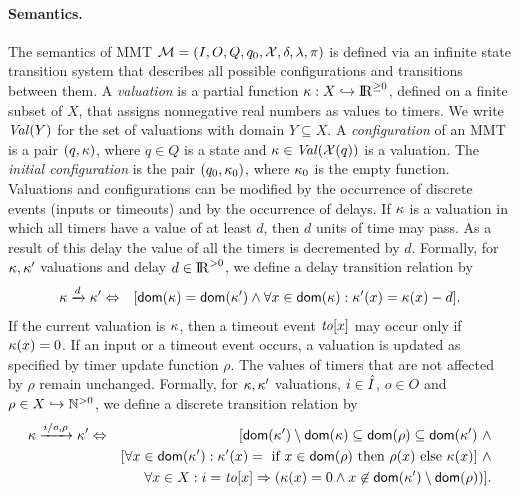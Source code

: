 \paragraph{Semantics.}
The semantics of MMT ${\cal M} = (I, O, Q, q_0, \mathcal{X}, \delta, \lambda, \pi)$ is defined via an infinite state transition system that describes all possible
configurations and transitions between them.
A \emph{valuation} is a partial function
$\kappa : X \hookrightarrow {\rm I\!R}^{\geq 0}$, defined on a finite subset of $X$, that assigns nonnegative real numbers as values to timers.
We write $\mathit{Val}({Y})$ for the set of valuations with domain $Y \subseteq X$.
A \emph{configuration} of an MMT is a pair $(q,\kappa)$, where $q \in Q$ is a state and $\kappa\in\mathit{Val}({\mathcal{X}(q)})$ is a valuation.
The \emph{initial configuration} is the pair $(q_0, \kappa_0)$, where $\kappa_0$ is the empty function.
Valuations and configurations can be modified by the occurrence of discrete events (inputs or timeouts) and by
the occurrence of delays.
If $\kappa$ is a valuation in which all timers
have a value of at least $d$, then $d$ units of time may pass. As a result of this delay the value of all the timers is decremented by $d$.
Formally, for $\kappa, \kappa'$ valuations and delay $d \in {\rm I\!R}^{> 0}$, we define a delay transition relation by
\begin{eqnarray*}
\kappa \xrightarrow{d} \kappa' & \Leftrightarrow & [{\textsf{dom}}(\kappa) = {\textsf{dom}}(\kappa') \wedge \forall x \in{\textsf{dom}}(\kappa) : \kappa'(x) = \kappa(x) - d ].
\end{eqnarray*}
If the current valuation is $\kappa$, then a timeout event $\mathit{to}[x]$ may occur only if $\kappa(x)=0$.
If an input or a timeout event occurs, a valuation is updated as specified by timer update function $\rho$.
The values of timers that are not affected by $\rho$ remain unchanged.
Formally, for $\kappa, \kappa'$ valuations, $i \in \hat{I}$, $o \in O$ and $\rho \in X \hookrightarrow {\mathbb N}^{>0}$,
we define a discrete transition relation by
\begin{eqnarray*}
\kappa \xrightarrow{i/o, \rho}  \kappa' & \Leftrightarrow & [ {\textsf{dom}}(\kappa') \setminus {\textsf{dom}}(\kappa)  \subseteq {\textsf{dom}}(\rho) \subseteq {\textsf{dom}}(\kappa') ~ \wedge\\
&& [\forall x \in{\textsf{dom}}(\kappa') : \kappa'(x) = \mbox{ if } x \in{\textsf{dom}}(\rho) \mbox{ then } \rho(x) \mbox{ else } \kappa(x)] ~ \wedge\\
&& \forall x \in X : i=\mathit{to}[x] \Rightarrow (\kappa(x) = 0 \wedge x \not\in{\textsf{dom}}(\kappa') \setminus {\textsf{dom}}(\rho))].
\end{eqnarray*}
